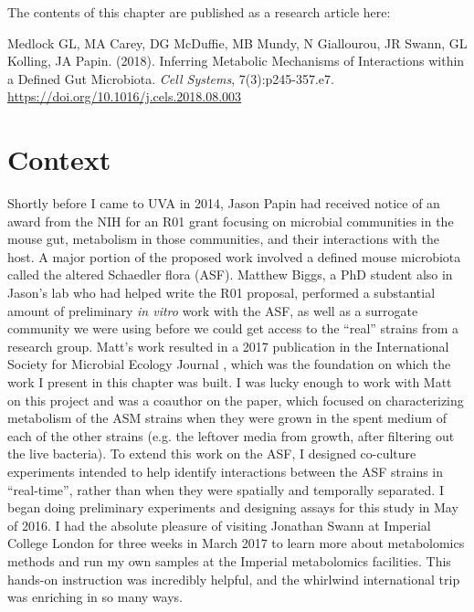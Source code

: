 \documentclass[11pt,twocolumn,notitlepage,openany,twoside]{book}
\begin{document}
\begin{refsection}

The contents of this chapter are published as a research article here:

\medskip\noindent
Medlock GL, MA Carey, DG McDuffie, MB Mundy, N Giallourou, JR Swann, GL Kolling, JA Papin. (2018). Inferring Metabolic Mechanisms of Interactions within a Defined Gut Microbiota. \textit{Cell Systems}, 7(3):p245-357.e7. \url{https://doi.org/10.1016/j.cels.2018.08.003}

\section{Context}

Shortly before I came to UVA in 2014, Jason Papin had received notice of an award from the NIH for an R01 grant focusing on microbial communities in the mouse gut, metabolism in those communities, and their interactions with the host. A major portion of the proposed work involved a defined mouse microbiota called the altered Schaedler flora (ASF). Matthew Biggs, a PhD student also in Jason's lab who had helped write the R01 proposal, performed a substantial amount of preliminary \textit{in vitro} work with the ASF, as well as a surrogate community we were using before we could get access to the ``real'' strains from a research group. Matt's work resulted in a 2017 publication in the International Society for Microbial Ecology Journal \cite{Biggs2017-fs}, which was the foundation on which the work I present in this chapter was built. I was lucky enough to work with Matt on this project and was a coauthor on the paper, which focused on characterizing metabolism of the ASM strains when they were grown in the spent medium of each of the other strains (e.g. the leftover media from growth, after filtering out the live bacteria). To extend this work on the ASF, I designed co-culture experiments intended to help identify interactions between the ASF strains in ``real-time'', rather than when they were spatially and temporally separated. I began doing preliminary experiments and designing assays for this study in May of 2016. I had the absolute pleasure of visiting Jonathan Swann at Imperial College London for three weeks in March 2017 to learn more about metabolomics methods and run my own samples at the Imperial metabolomics facilities. This hands-on instruction was incredibly helpful, and the whirlwind international trip was enriching in so many ways.


\end{refsection}
\end{document}
